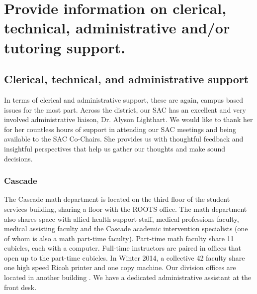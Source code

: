 


\section[Clerical, technical, administrative and/or tutoring support]{Provide information on clerical, technical, administrative and/or tutoring support.}


\subsection{Clerical, technical, and administrative support}

In terms of clerical and administrative support, these are again, campus based issues for the most part. Across the district, our SAC has an excellent and very involved administrative liaison, Dr. Alyson Lighthart. We would like to thank her for her countless hours of support in attending our SAC meetings and being available to the SAC Co-Chairs. She provides us with thoughtful feedback and insightful perspectives that help us gather our thoughts and make sound decisions. 


\subsubsection{Cascade}
The Cascade math department is located on the third floor of the student services building, sharing a floor with the ROOTS office. The math department also shares space with allied health support staff, medical professions faculty, medical assisting faculty and the Cascade academic intervention specialists (one of whom is also a math part-time faculty).  Part-time math faculty share 11 cubicles, each with a computer. Full-time instructors are paired in offices that open up to the part-time cubicles. In Winter 2014, a collective 42 faculty share one high speed Ricoh printer and one copy machine. Our division offices are located in another building . We have a dedicated administrative assistant at the front desk. 

